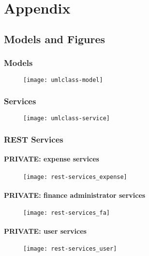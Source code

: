 \part*{Appendix}
\chapter{Models and Figures}
\section{Models}
\label{sec:app-models}

\begin{figure}[H]
	{\texttt{[image: umlclass-model]}}
\end{figure}
\newpage

\section{Services}
\label{sec:app-service}

\begin{figure}[H]
	{\texttt{[image: umlclass-service]}}
\end{figure}
\newpage

\section{REST Services}
\label{sec:rest-services}

\subsection{PRIVATE: expense services}
\begin{figure}[H]
	{\texttt{[image: rest-services\_expense]}}
\end{figure}
\newpage

\subsection{PRIVATE: finance administrator services}
\begin{figure}[H]
	{\texttt{[image: rest-services\_fa]}}
\end{figure}

\subsection{PRIVATE: user services}
\begin{figure}[H]
	{\texttt{[image: rest-services\_user]}}
\end{figure}

